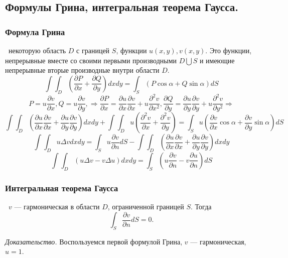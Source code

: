 \documentclass[9pt]{article}
\begin{document}
\subsection{Формулы Грина, интегральная теорема Гаусса.}

\subsubsection{Формула Грина}

\ 
 некоторую область \(D\) с границей \(S\), функции \(u(x,y),v(x,y)\). Это функции, непрерывные вместе со своими первыми производными \(D\bigcup S\) и имеющие непрерывные вторые производные внутри области \(D\).
\[\int\int_D\left(\dfrac{\partial P}{\partial x}+\dfrac{\partial Q}{\partial y}\right)dxdy=\int_S(P\cos\alpha+Q\sin\alpha)d S\]
\[P=u\dfrac{\partial v}{\partial x},Q=u\dfrac{\partial v}{\partial y},\Rightarrow\dfrac{\partial P}{\partial x}=\dfrac{\partial u}{\partial x}\dfrac{\partial v}{\partial x}+u\dfrac{\partial^2v}{\partial x^2},\dfrac{\partial Q}{\partial y}=\dfrac{\partial u}{\partial y}\dfrac{\partial v}{\partial y}+u\dfrac{\partial^2v}{\partial y^2}\Rightarrow\]
\[\int\int_D\left(\dfrac{\partial u}{\partial x}\dfrac{\partial v}{\partial x}+\dfrac{\partial u}{\partial y}\dfrac{\partial v}{\partial y}\right)dxdy+\int\int_D u\left(\dfrac{\partial^2 v}{\partial x}+\dfrac{\partial^2 v}{\partial y}\right)=\int_Su\left(\dfrac{\partial v}{\partial x}\cos\alpha+\dfrac{\partial v}{\partial y}\sin\alpha\right)dS\]
\begin{equation}
    \int\int_Du\Delta vdxdy=\int_Su\dfrac{\partial v}{\partial n}dS-\int\int_D\left(\dfrac{\partial u}{\partial x}\dfrac{\partial v}{\partial x}+\dfrac{\partial u}{\partial y}\dfrac{\partial v}{\partial y}\right)dxdy
\end{equation}
\begin{equation}
    \int\int_D(u\Delta v-v\Delta u)dxdy=\int_S\left(u\dfrac{\partial v}{\partial n}-v\dfrac{\partial u}{\partial n}\right)dS
\end{equation}

\subsubsection{Интегральная теорема Гаусса}

\ 
 \(v\) --- гармоническая в области \(D\), ограниченной границей \(S\). Тогда
\begin{equation}
    \int_S\dfrac{\partial v}{\partial n}dS=0.
\end{equation}
\par\textit{Доказательство.} Воспользуемся первой формулой Грина, \(v\) --- гармоническая, \(u=1\).
\end{document}
